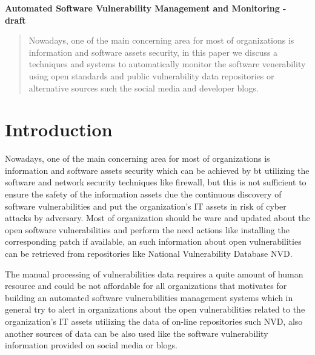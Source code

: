 \documentclass{llncs}
\begin{document}
\begin{flushleft}
 
\LARGE\bf Automated Software Vulnerability Management and Monitoring - draft 

\end{flushleft}

\newpage

\tableofcontents

\newpage


\begin{abstract}
Nowadays, one of the main concerning area for most of organizations is information and software assets security, in this paper we discuss a techniques and systems to automatically monitor the software venerability using open standards and public vulnerability data repositories or alternative sources such the social media and developer blogs. 
\end{abstract}

\section{Introduction}

\par Nowadays, one of the main concerning area for most of organizations is information and software assets security which can  be achieved by
bt utilizing the software and network security techniques like firewall, but this is not sufficient to ensure the safety of the information assets due the continuous discovery of software vulnerabilities and put the organization's IT assets in risk of cyber attacks  by adversary. Most of organization should be ware and updated about the open software vulnerabilities and perform the need actions like installing the corresponding patch if available, an such information about open vulnerabilities can be retrieved from repositories like National Vulnerability Database NVD.
 
\par The manual processing of vulnerabilities data requires a quite amount of human resource and could be not affordable for all organizations that motivates for building an  automated software vulnerabilities management systems  which in general try to alert in organizations about the open vulnerabilities related to the organization's IT assets utilizing the data of on-line repositories such NVD, also another sources of data can be also used like the software vulnerability information provided on social media or blogs.
         
\end{document}
